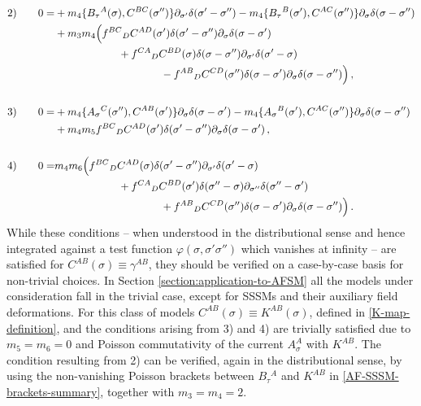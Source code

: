 \documentclass[12pt]{article}
\numberwithin{equation}{section}
\begin{document}
\begin{align}
2) \qquad 0=&+m_{4}\{B_{\tau}{}^{A}(\sigma),C^{BC}(\sigma'')\}\partial_{\sigma'}\delta(\sigma'-\sigma'')-m_{4}\{B_{\tau}{}^{B}(\sigma'),C^{AC}(\sigma'')\}\partial_{\sigma}\delta(\sigma-\sigma'')
\notag \\
&+m_{3}m_{4}\Bigl(f^{BC}{}_{D}C^{AD}(\sigma')\delta(\sigma'-\sigma'')\partial_{\sigma}\delta(\sigma-\sigma')
\notag \\
& \qquad \qquad \qquad +f^{CA}{}_{D}C^{BD}(\sigma)\delta(\sigma-\sigma'')\partial_{\sigma'}\delta(\sigma'-\sigma) 
\notag \\
& \qquad \qquad \qquad \qquad \qquad -f^{AB}{}_{D}C^{CD}(\sigma'')\delta(\sigma-\sigma')\partial_{\sigma}\delta(\sigma-\sigma'') \Bigr) \, ,
\\
\notag \\
3) \qquad 0=& +m_{4}\{A_{\sigma}{}^{C}(\sigma''),C^{AB}(\sigma')\}\partial_{\sigma}\delta(\sigma-\sigma')-m_{4}\{A_{\sigma}{}^{B}(\sigma'),C^{AC}(\sigma'')\}\partial_{\sigma}\delta(\sigma-\sigma'')
\notag \\
&+m_{4}m_{5}f^{BC}{}_{D}C^{AD}(\sigma')\delta(\sigma'-\sigma'')\partial_{\sigma}\delta(\sigma-\sigma') \, ,
\\
\notag \\
4) \qquad 0=& m_{4}m_{6}\Bigl(f^{BC}{}_{D}C^{AD}(\sigma)\delta(\sigma'-\sigma'')\partial_{\sigma'}\delta(\sigma'-\sigma)
\notag \\
& \qquad \qquad \qquad +f^{CA}{}_{D}C^{BD}(\sigma')\delta(\sigma''-\sigma)\partial_{\sigma''}\delta(\sigma''-\sigma') 
\notag \\
& \qquad \qquad \qquad \qquad \qquad +f^{AB}{}_{D}C^{CD}(\sigma'')\delta(\sigma-\sigma')\partial_{\sigma}\delta(\sigma-\sigma'') \Bigr) \, .
\end{align}
While these conditions -- when understood in the distributional sense and hence integrated against a test function $\varphi(\sigma,\sigma'\sigma'')$ which vanishes at infinity -- are satisfied for $C^{AB}(\sigma)\equiv \gamma^{AB}$, they should be verified on a case-by-case basis for non-trivial choices. In Section \ref{section:application-to-AFSM} all the models under consideration fall in the trivial case, except for SSSMs and their auxiliary field deformations. For this class of models $C^{AB}(\sigma)\equiv K^{AB}(\sigma)$, defined in \eqref{K-map-definition}, and the conditions arising from 3) and 4) are trivially satisfied due to $m_{5}=m_{6}=0$ and Poisson commutativity of the current $A_{\sigma}^{A}$ with $K^{AB}$. The condition resulting from 2) can be verified, again in the distributional sense, by using the non-vanishing Poisson brackets between $B_{\tau}{}^{A}$ and $K^{AB}$ in \eqref{AF-SSSM-brackets-summary}, together with $m_{3}=m_{4}=2$.
\end{document}
